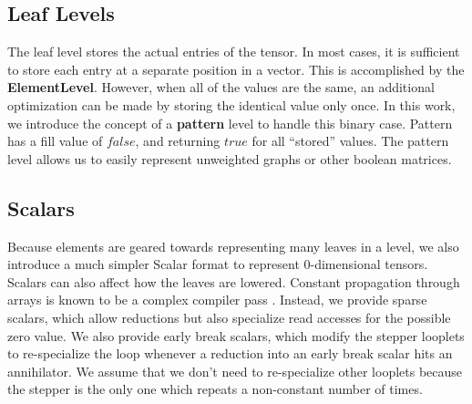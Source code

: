 
\subsection{Leaf Levels}

The leaf level stores the actual entries of the tensor. In most cases, it is
sufficient to store each entry at a separate position in a vector. This is accomplished by the \textbf{ElementLevel}. However, when all of the
values are the same, an additional optimization can be made by storing the
identical value only once. In this work, we introduce the concept of a \textbf{pattern}
level to handle this binary case. Pattern has a fill value of $false$, and returning $true$ for all ``stored'' values. The pattern level allows us to easily represent unweighted graphs or other boolean matrices.

\subsection{Scalars}
Because elements are geared towards representing many leaves in a level, we also introduce a much simpler Scalar format to represent 0-dimensional tensors.
%
Scalars can also affect how the leaves are lowered.
%
Constant propagation through arrays is known to be a complex compiler pass \cite{mcmichen_representing_nodate}.
%
Instead, we provide sparse scalars, which allow reductions but also specialize read accesses for the possible zero value.
%
We also provide early break scalars, which modify the stepper looplets to
re-specialize the loop whenever a reduction into an early break scalar hits an
annihilator.
%
We assume that we don't need to re-specialize other looplets because the stepper
is the only one which repeats a non-constant number of times.

